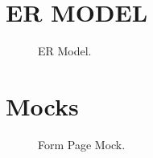 \chapter{ER MODEL}\label{er}

\begin{figure}[H]
	\begin{center}
	\end{center}
	\caption{ER Model.}
\end{figure}



\chapter{Mocks}\label{mocks}

\begin{figure}[h]
	\begin{center}
	\end{center}
	\caption{Form Page Mock.}\label{fig:form}
\end{figure}

